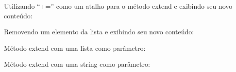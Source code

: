 \documentclass[letterpaper,10pt,brazil]{sphinxmanual}
\begin{document}
Utilizando “+=” como um atalho para o método extend e exibindo seu novo conteúdo:

\begin{sphinxVerbatim}[commandchars=\\\{\}]
  \PYG{p}{[}\PYG{p}{]}
\end{sphinxVerbatim}

\begin{sphinxVerbatim}[commandchars=\\\{\}]
\end{sphinxVerbatim}

Removendo um elemento da lista e exibindo seu novo conteúdo:

\begin{sphinxVerbatim}[commandchars=\\\{\}]
\end{sphinxVerbatim}

\begin{sphinxVerbatim}[commandchars=\\\{\}]
\end{sphinxVerbatim}

Método extend com uma lista como parâmetro:

\begin{sphinxVerbatim}[commandchars=\\\{\}]
\PYG{p}{[}\PYG{p}{]}
\end{sphinxVerbatim}

\begin{sphinxVerbatim}[commandchars=\\\{\}]
\end{sphinxVerbatim}

Método extend com uma string como parâmetro:

\begin{sphinxVerbatim}[commandchars=\\\{\}]
\end{sphinxVerbatim}
\end{document}
